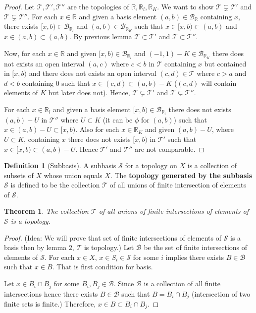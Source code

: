 \documentclass[12pt,reqno]{amsart}
\theoremstyle{plain}
\newtheorem{thm}{Theorem}
\theoremstyle{definition}
\newtheorem{defn}{Definition}
\newcommand{\bb}[1]{\mathbb{#1}}
\newcommand{\cal}[1]{\mathcal{#1}}
\begin{document}
\begin{proof}
    Let $\mathcal{T}, \cal T', \cal T''$ are the topologies of $\bb R, \bb R_l, \bb R_K$. We want to show $\cal T \subsetneq \cal T'$ and $\cal T \subsetneq \cal T''$. For each $x \in \bb R$ and given a basis element $(a,b) \in \cal B_{\bb R}$ containing $x$, there exists $[x,b) \in \cal B_{\bb R_l}$ and $(a,b) \in \cal B_{\bb R_K}$ such that $x \in [x,b) \subset (a,b)$ and $x \in (a,b) \subset (a,b)$. By previous lemma $\cal T \subset \cal T'$ and $\cal T \subset \cal T''$.
    \par Now, for each $x \in \bb R$ and given $[x,b) \in \cal B_{\bb R_l}$ and $(-1,1) - K \in \cal B_{\bb R_K}$ there does not exists an open interval $(a,c)$ where $c < b$ in $\cal T$ containing $x$ but contained in $[x,b)$ and there does not exists an open interval $(c,d) \in \cal T$ where $c > a$ and $d < b$ containing $0$ such that $x \in (c,d) \subset (a,b) - K$ ($(c,d)$ will contain elements of $K$ but later does not). Hence, $\cal T \subsetneq \cal T'$ and $\cal T \subsetneq \cal T''$. 
    \par For each $x \in \bb R_l$ and given a basis element $[x, b) \in \cal B_{\bb R_l}$ there does not exists $(a,b) - U$ in $\cal T'' $ where $U \subset K$ (it can be $\phi$ for $(a,b)$) such that $x \in (a,b) - U \subset [x,b)$. Also for each $x \in \bb R_K$ and given $(a,b) - U$, where $U \subset K$, containing $x$ there does not exists $[x,b)$ in $\cal T'$ such that $x \in [x,b) \subset (a,b)- U$. Hence $\cal T'$ and $\cal T''$ are not comparable.
\end{proof}
\begin{defn}[Subbasis]
    A subbasis $\cal{S}$ for a topology on $X$ is a collection of subsets of $X$ whose union equals $X$. The {\bf topology generated by the subbasis $\cal S$} is defined to be the collection $\cal T$ of all unions of finite intersection of elements of $\cal S$. 
\end{defn}
\begin{thm}
    The collection $\cal T$ of all unions of finite intersections of elements of $\cal S$ is a topology.
\end{thm}
\begin{proof} (Idea: We will prove that set of finite intersections of elements of $\cal S$ is a basis then by lemma $2$, $\cal T$ is topology.)
    Let $\cal B$ be the set of finite intersections of elements of $\cal S$. For each $x \in X$, $x \in S_i \in \cal S$ for some $i$ implies there exists $B \in \cal B$ such that $x \in B$. That is first condition for basis. 
    \par Let $x \in B_i \cap B_j$ for some $B_i,B_j \in \cal B$. Since $\cal B$ is a collection of all finite intersections hence there exists $B \in \cal B$ such that $B = B_i \cap B_j$ (intersection of two finite sets is finite.) Therefore, $x \in B \subset B_i \cap B_j$.
\end{proof}
\end{document}
